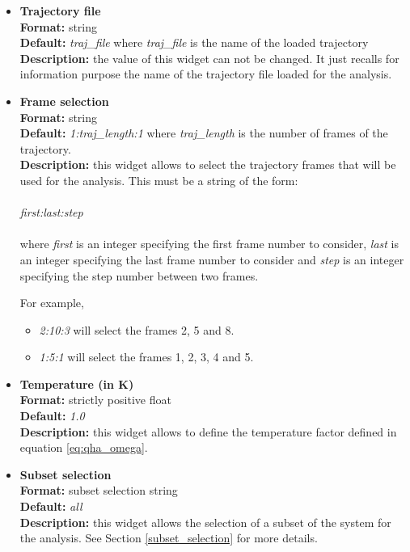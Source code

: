 \documentclass[a4paper,11pt]{report}
\begin{document}
\hypertarget{qha_trajectory_file}{}
\begin{itemize}
\item \textbf{Trajectory file}\\
\textbf{Format:} string\\
\textbf{Default:} \textit{traj\_file} where \textit{traj\_file} is the name of the loaded trajectory\\
\textbf{Description:} the value of this widget can not be changed. It just recalls for information purpose the name
of the trajectory file loaded for the analysis.

\hypertarget{qha_frame_selection}{}
\item \textbf{Frame selection}\\
\textbf{Format:} string\\
\textbf{Default:} \textit{1:traj\_length:1} where \textit{traj\_length} is the number of frames of the trajectory.\\
\textbf{Description:} this widget allows to select the trajectory frames that will be used for the analysis. This must
be a string of the form:
\\\\
\textit{first:last:step}
\\\\
where \textit{first} is an integer specifying the first frame number to consider, \textit{last} is an integer specifying the last 
frame number to consider and \textit{step} is an integer specifying the step number between two frames.

For example,
\begin{itemize}
\item \textit{2:10:3} will select the frames 2, 5 and 8.
\item \textit{1:5:1} will select the frames 1, 2, 3, 4 and 5.
\end{itemize}

\hypertarget{qha_temperature}{}
\item \textbf{Temperature (in K)}\\
\textbf{Format:} strictly positive float\\
\textbf{Default:} \textit{1.0}\\
\textbf{Description:} this widget allows to define the temperature factor defined in equation \ref{eq:qha_omega}.

\hypertarget{qha_subset_selection}{}
\item \textbf{Subset selection}\\
\textbf{Format:} subset selection string\\
\textbf{Default:} \textit{all}\\
\textbf{Description:} this widget allows the selection of a subset of the system for the analysis. 
See Section \ref{subset_selection} for more details.


\end{itemize}
\end{document}
